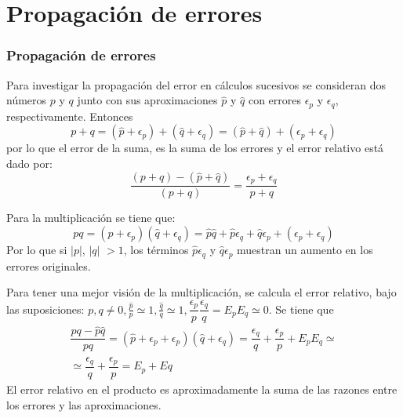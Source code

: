 \section{Propagación de errores}
\begin{frame}
\frametitle{Propagación de errores}
Para investigar la propagación del error en cálculos sucesivos se consideran dos números $p$ y $q$ junto con sus aproximaciones  $\widehat{p}$ y  $\widehat{q}$ con errores $\epsilon_{p}$ y $\epsilon_{q}$, respectivamente. Entonces
\[ p+q = (\widehat{p} + \epsilon_{p}) + (\widehat{q}+ \epsilon_{q}) = (\widehat{p}+\widehat{q})+ (\epsilon_{p} + \epsilon_{q}) \]
por lo que el error de la suma, es la suma de los errores y el error relativo está dado por:
\[ \dfrac{(p+q)-(\widehat{p}+\widehat{q})}{(p+q)} = \dfrac{\epsilon_{p} + \epsilon_{q}}{p+q}\]
\end{frame}
\begin{frame}
Para la multiplicación se tiene que:
\[ pq = (\widehat{p}+\epsilon_{p})(\widehat{q}+\epsilon_{q}) = \widehat{p}\widehat{q}+\widehat{p}\epsilon_{q}+\widehat{q}\epsilon_{p} + (\epsilon_{p} + \epsilon_{q})\]
Por lo que si $\vert p \vert$, $\vert q \vert$ $>1$, los términos $\widehat{p}\epsilon_{q}$ y $\widehat{q} \epsilon_{p}$ muestran un aumento en los errores originales.
\end{frame}
\begin{frame}
Para tener una mejor visión de la multiplicación, se calcula el error relativo, bajo las suposiciones: $p,q \neq 0, \frac{\widehat{p}}{p} \simeq 1 , \frac{\widehat{q}}{q} \simeq 1, \dfrac{\epsilon_{p}}{p} \dfrac{\epsilon_{q}}{q} = E_{p} E_{q} \simeq 0$. Se tiene que
\[ \begin{split} \dfrac{pq-\widehat{p}\widehat{q}}{pq} = (\widehat{p}+\epsilon_{p}+\epsilon_{p})(\widehat{q}+\epsilon_{q}) = \dfrac{\epsilon_{q}}{q}+\dfrac{\epsilon_{p}}{p}+ E_{p}E_{q} \simeq \\
\simeq \dfrac{\epsilon_{q}}{q}+\dfrac{\epsilon_{p}}{p} = E_{p}+E{q}
\end{split}  \]
El error relativo en el producto es aproximadamente la suma de las razones entre los errores y las aproximaciones.
\end{frame}

